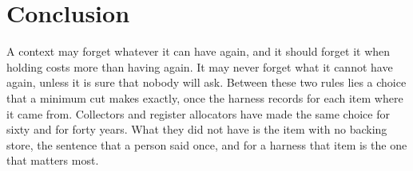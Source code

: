 \documentclass[acmsmall,nonacm,screen]{acmart}
\begin{document}
\section{Conclusion}

A context may forget whatever it can have again, and it should forget it when holding costs
more than having again. It may never forget what it cannot have again, unless it is sure
that nobody will ask. Between these two rules lies a choice that a minimum cut makes
exactly, once the harness records for each item where it came from. Collectors and register
allocators have made the same choice for sixty and for forty years. What they did not have
is the item with no backing store, the sentence that a person said once, and for a harness
that item is the one that matters most.



\end{document}

